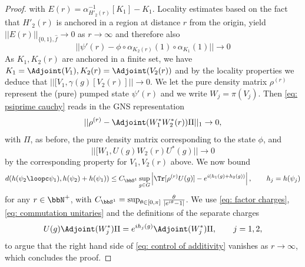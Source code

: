 \begin{proof}
	with $E(r)=\alpha^{-1}_{H'_2(r)}[K_1]-K_1$.  Locality estimates based on the fact that $H'_2(r)$ is anchored in a region at distance $r$ from the origin, yield  $||E(r)||_{\{0,1\},\hat{f}}\to 0$ as $r\to\infty$ and therefore also
	\begin{equation}\label{eq: psiprime cauchy}
		||   \psi'(r) -  \phi \circ \alpha_{K_2(r)}(1) \circ \alpha_{K_1}(1) || \to 0
	\end{equation}
	As $K_1,K_2(r)$ are anchored in a finite set, we have $K_1=\Adjoint(V_1), K_2(r)=\Adjoint(V_2(r)) $ and by the locality properties we deduce that  $ ||[V_1,\gamma(g)[V_2(r)]|| \to 0$.
	We let the pure density matrix $\rho^{(r)}$ represent the (pure) pumped state $\psi'(r)$ and we write $W_j = \pi(V_j)$.  Then \eqref{eq: psiprime cauchy} reads in the GNS representation
	\begin{equation}\label{eq: factor charges}
		|| \rho^{(r)}-  \Adjoint(W^*_1 W^*_2(r))\Pi  ||_1 \to 0,
	\end{equation}
	with $\Pi$, as before, the pure density matrix corresponding to the state $\phi$, and 
	\begin{equation}\label{eq: commutation unitaries}
		||[W_1,U(g)W_2(r)U^*(g)|| \to 0
	\end{equation}
	by the corresponding property for $V_1,V_2(r)$ above. We now bound
	\begin{equation} \label{eq: control of additivity}
		d(h(\psi_2\loopc\psi_1),h(\psi_2)+h(\psi_1)) \leq {C_{\bbS^1}}\sup_{g\in G}\left| \Tr [ \rho^{(r)} U(g)] - e^{i(h_1(g)+h_2(g))}   \right|, \qquad h_j=h(\psi_j)
	\end{equation}
	for any  $r\in\bbN^+$, with $C_{\bbS^1}=\sup_{\theta\in[0,\pi]}\frac{\theta}{|e^{i\theta}-1|}$.    We use \eqref{eq: factor charges}, \eqref{eq: commutation unitaries} and the definitions of the separate charges
	$$
	U(g)\Adjoint(W^*_j)\Pi =   e^{i h_j(g)}  \Adjoint(W^*_j)\Pi,\qquad  j=1,2,
	$$
	to argue that the right hand side of \eqref{eq: control of additivity} vanishes as $r\to\infty$, which concludes the proof. 

\end{proof}
